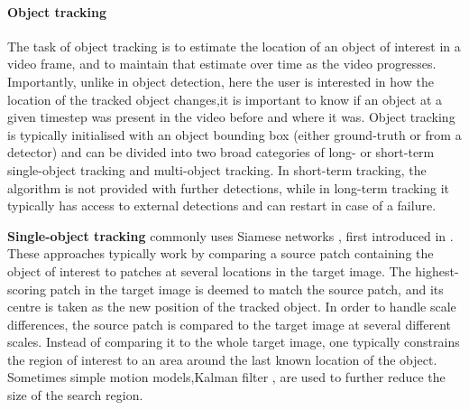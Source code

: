 	\paragraph{Object tracking}
	The task of object tracking is to estimate the location of an object of interest in a video frame, and to maintain that estimate over time as the video progresses.
	Importantly, unlike in object detection, here the user is interested in how the location of the tracked object changes,\ie it is important to know if an object at a given timestep was present in the video before and where it was.
	Object tracking is typically initialised with an object bounding box (either ground-truth or from a detector) and can be divided into two broad categories of long- or short-term single-object tracking and multi-object tracking.
	In short-term tracking, the algorithm is not provided with further detections, while in long-term tracking it typically has access to external detections and can restart in case of a failure.
	
%	
%
	\textbf{Single-object tracking} commonly uses Siamese networks \citep{Valmadre2017,Held2016goturn}, first introduced in \cite{Bromley1993siamese,Schmidhuber1993dicovering}.
	These approaches typically work by comparing a source patch containing the object of interest to patches at several locations in the target image.
	The highest-scoring patch in the target image is deemed to match the source patch, and its centre is taken as the new position of the tracked object.
	In order to handle scale differences, the source patch is compared to the target image at several different scales.
	Instead of comparing it to the whole target image, one typically constrains the region of interest to an area around the last known location of the object.
	Sometimes simple motion models,\eg Kalman filter  \citep{Swerling1959kalman,Kalman1961kalman}, are used to further reduce the size of the search region.
	
